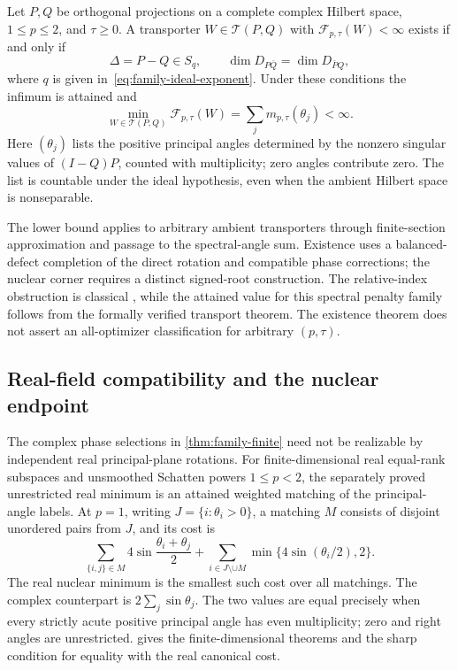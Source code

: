 \begin{theorem}
\label{thm:family-infinite}
Let $P,Q$ be orthogonal projections on a complete complex Hilbert
space, $1\le p\le2$, and $\tau\ge0$.  A transporter
$W\in\mathcal T(P,Q)$ with $\mathcal F_{p,\tau}(W)<\infty$
exists if and only if
\begin{equation}
 \Delta=P-Q\in S_q,
 \qquad \dim D_{P\bar Q}=\dim D_{\bar P Q},
 \label{eq:family-ideal-and-defect}
\end{equation}
where $q$ is given in~\eqref{eq:family-ideal-exponent}.
Under these conditions the infimum is attained and
\begin{equation}
 \min_{W\in\mathcal T(P,Q)}\mathcal F_{p,\tau}(W)
   =\sum_j m_{p,\tau}(\theta_j)<\infty.
 \label{eq:family-infinite-minimum}
\end{equation}
Here $(\theta_j)$ lists the positive principal angles determined by
the nonzero singular values of $(I-Q)P$, counted with multiplicity;
zero angles contribute zero.  The list is countable under the ideal
hypothesis, even when the ambient Hilbert space is nonseparable.
\end{theorem}

The lower bound applies to arbitrary ambient transporters through
finite-section approximation and passage to the spectral-angle sum.
Existence uses a balanced-defect completion of the direct rotation and
compatible phase corrections; the nuclear corner requires a distinct
signed-root construction.  The relative-index obstruction is classical
\citep{avron1994index}, while the attained value for this spectral
penalty family follows from the formally verified transport theorem.
The existence theorem does not assert an all-optimizer classification
for arbitrary $(p,\tau)$.

\subsection{Real-field compatibility and the nuclear endpoint}
\label{sec:family-real}

The complex phase selections in \cref{thm:family-finite} need not be
realizable by independent real principal-plane rotations.  For
finite-dimensional real equal-rank subspaces and unsmoothed Schatten
powers $1\le p<2$, the separately proved unrestricted real minimum is
an attained weighted matching of the principal-angle labels.
At $p=1$, writing $J=\{i:\theta_i>0\}$, a matching $M$ consists of
disjoint unordered pairs from $J$, and its cost is
\begin{equation}
 \sum_{\{i,j\}\in M}4\sin\frac{\theta_i+\theta_j}{2}
 +\sum_{i\in J\setminus\cup M}
          \min\{4\sin(\theta_i/2),2\}.
 \label{eq:family-real-matching}
\end{equation}
The real nuclear minimum is the smallest such cost over all matchings.
The complex counterpart is $2\sum_j\sin\theta_j$.
The two values are equal precisely when every strictly acute positive
principal angle has even multiplicity; zero and right angles are
unrestricted.   gives the finite-dimensional
theorems and the sharp condition for equality with the real canonical
cost.

